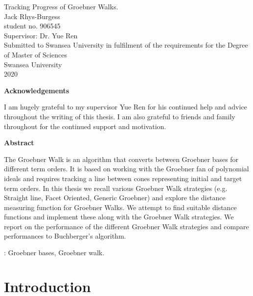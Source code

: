 \documentclass[12pt,a4paper]{report}
\begin{document}
\thispagestyle{empty} {\LARGE\bf
\begin{center}
Tracking Progress of Groebner Walks.\\[30mm] Jack Rhys-Burgess \\ student no. 906545\\ Supervisor: Dr. Yue Ren\\[55mm] Submitted to Swansea University  in fulfilment of the requirements for the Degree of Master of Sciences\\[5mm]Swansea University \\2020
\end{center}
}
\newpage
\begin{center} {\large \bf Acknowledgements}\end{center}
I am hugely grateful to my supervisor Yue Ren for his continued help and advice throughout the writing of this thesis. I am also grateful to friends and family throughout for the continued support and motivation.

\setcounter{page}{1}

\newpage
\begin{center} {\large \bf Abstract}\end{center}

The Groebner Walk is an algorithm that converts between Groebner bases for different term orders. It is based on working with the Groebner fan of polynomial ideals and requires tracking a line between cones representing initial and target term orders. In this thesis we recall various Groebner Walk strategies (e.g. Straight line, Facet Oriented, Generic Groebner) and explore the distance measuring function for Groebner Walks. We attempt to find suitable distance functions and implement these along with the Groebner Walk strategies. We report on the performance of the different Groebner Walk strategies and compare performances to Buchberger's algorithm.
\vspace{5mm}


:  Groebner bases, Groebner walk.   

\tableofcontents





\chapter{Introduction}
\setcounter{page}{1}
\end{document}
